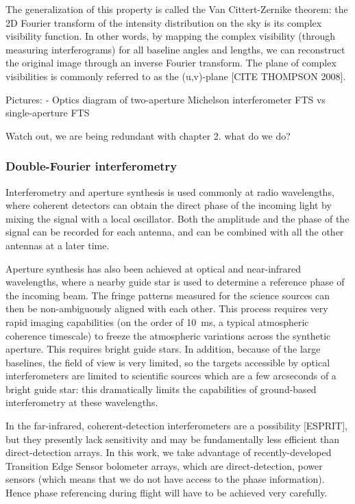 The generalization of this property is called the Van Cittert-Zernike theorem: the 2D Fourier transform of the intensity distribution on the sky is its complex visibility function. In other words, by mapping the complex visibility (through measuring interferograms) for all baseline angles and lengths, we can reconstruct the original image through an inverse Fourier transform. The plane of complex visibilities is commonly referred to as the (u,v)-plane [CITE THOMPSON 2008].





Pictures:
- Optics diagram of two-aperture Michelson interferometer FTS vs single-aperture FTS

Watch out, we are being redundant with chapter 2. what do we do?

\subsubsection{Double-Fourier interferometry}

Interferometry and aperture synthesis is used commonly at radio wavelengths, where coherent detectors can obtain the direct phase of the incoming light by mixing the signal with a local oscillator. Both the amplitude and the phase of the signal can be recorded for each antenna, and can be combined with all the other antennas at a later time.

Aperture synthesis has also been achieved at optical and near-infrared wavelengths, where a nearby guide star is used to determine a reference phase of the incoming beam. The fringe patterns measured for the science sources can then be non-ambiguously aligned with each other. This process requires very rapid imaging capabilities (on the order of \SI{10}{\milli\second}, a typical atmospheric coherence timescale) to freeze the atmospheric variations across the synthetic aperture. This requires bright guide stars. In addition, because of the large baselines, the field of view is very limited, so the targets accessible by optical interferometers are limited to scientific sources which are a few arcseconds of a bright guide star: this dramatically limits the capabilities of ground-based interferometry at these wavelengths.

In the far-infrared, coherent-detection interferometers are a possibility [ESPRIT], but they presently lack sensitivity and may be fundamentally less efficient than direct-detection arrays. In this work, we take advantage of recently-developed Transition Edge Sensor bolometer arrays, which are direct-detection, power sensors (which means that we do not have access to the phase information). Hence phase referencing during flight will have to be achieved very carefully.

